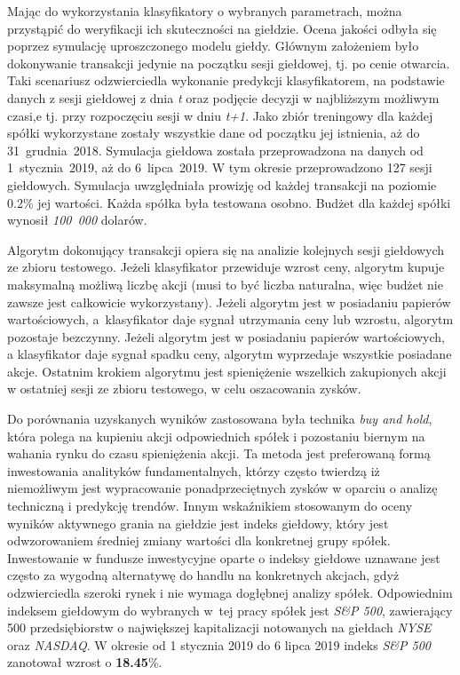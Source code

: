 \documentclass[a4paper, twoside, 11pt, openright]{article}
\begin{document}
Mając do wykorzystania klasyfikatory o wybranych parametrach, można przystąpić do weryfikacji ich skuteczności na giełdzie. Ocena jakości odbyła się poprzez symulację uproszczonego modelu giełdy. Głównym założeniem było dokonywanie transakcji jedynie na początku sesji giełdowej, tj. po cenie otwarcia. Taki scenariusz odzwierciedla wykonanie predykcji klasyfikatorem, na podstawie danych z sesji giełdowej z dnia \textit{t} oraz podjęcie decyzji w najbliższym możliwym czasi,e tj. przy rozpoczęciu sesji w dniu \textit{t+1}. Jako zbiór treningowy dla każdej spółki wykorzystane zostały wszystkie dane od początku jej istnienia, aż do 31~grudnia~2018. Symulacja giełdowa została przeprowadzona na danych od 1~stycznia~2019, aż do 6~lipca~2019. W tym okresie przeprowadzono 127 sesji giełdowych. Symulacja uwzględniała prowizję od każdej transakcji na poziomie 0.2\% jej wartości. Każda spółka była testowana osobno. Budżet dla każdej spółki wynosił \textit{100~000} dolarów.

\bigskip

Algorytm dokonujący transakcji opiera się na analizie kolejnych sesji giełdowych ze zbioru testowego. Jeżeli klasyfikator przewiduje wzrost ceny, algorytm kupuje maksymalną możliwą liczbę akcji (musi to być liczba naturalna, więc budżet nie zawsze jest całkowicie wykorzystany). Jeżeli algorytm jest w posiadaniu papierów wartościowych, a~klasyfikator daje sygnał utrzymania ceny lub wzrostu, algorytm pozostaje bezczynny. Jeżeli algorytm jest w posiadaniu papierów wartościowych, a klasyfikator daje sygnał spadku ceny, algorytm wyprzedaje wszystkie posiadane akcje. Ostatnim krokiem algorytmu jest spieniężenie wszelkich zakupionych akcji w ostatniej sesji ze zbioru testowego, w celu oszacowania zysków.

\bigskip

Do porównania uzyskanych wyników zastosowana była technika \textit{buy and hold}, która polega na kupieniu akcji odpowiednich spółek i pozostaniu biernym na wahania rynku do czasu spieniężenia akcji. Ta metoda jest preferowaną formą inwestowania analityków fundamentalnych, którzy często twierdzą iż niemożliwym jest wypracowanie ponadprzeciętnych zysków w oparciu o analizę techniczną i predykcję trendów. Innym wskaźnikiem stosowanym do oceny wyników aktywnego grania na giełdzie jest indeks giełdowy, który jest odwzorowaniem średniej zmiany wartości dla konkretnej grupy spółek. Inwestowanie w fundusze inwestycyjne oparte o indeksy giełdowe uznawane jest często za wygodną alternatywę do handlu na konkretnych akcjach, gdyż odzwierciedla szeroki rynek i nie wymaga dogłębnej analizy spółek. Odpowiednim indeksem giełdowym do wybranych w~tej pracy spółek jest \textit{S\&P 500}, zawierający 500 przedsiębiorstw o największej kapitalizacji notowanych na giełdach \textit{NYSE} oraz \textit{NASDAQ}. W okresie od 1 stycznia 2019 do 6 lipca 2019 indeks \textit{S\&P 500} zanotował wzrost o \textbf{18.45}\%.
\end{document}
